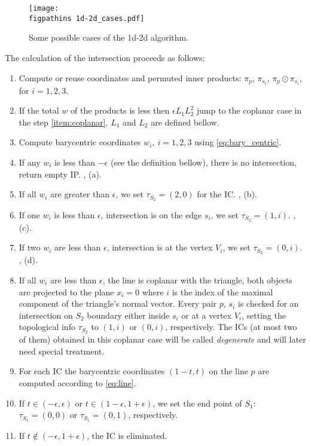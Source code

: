 \begin{figure}[!htb]
    \centering
    \texttt{[image: \\figpathins 1d-2d\_cases.pdf]}
    \caption{Some possible cases of the 1d-2d algorithm.}
    \label{fig:1d2d_cases}
\end{figure}


The calculation of the intersection proceeds as follows:
\begin{enumerate}
    \item Compute or reuse \plucker coordinates and permuted inner products: $\pi_p$, $\pi_{s_i}$, $\pi_p \odot \pi_{s_i}$, for $i=1,2,3$.
    \item \label{item:zero_total} If the total $w$ of the products is less then $\epsilon L_1 L_2^2$ jump to the coplanar case in the step \ref{item:coplanar}.
          $L_1$ and $L_2$ are defined bellow.
    \item Compute barycentric coordinates $w_i,\ i=1,2,3$ using \eqref{eq:bary_centric}.
    \item If any $w_i$ is less than $-\epsilon$ (see the definition bellow), there is no intersection, return empty IP. , (a).          
    \item If all $w_i$ are greater than $\epsilon$, we set $\tau_{S_2} = (2, 0)$ for the IC. , (b).
    \item If one $w_i$ is less than $\epsilon$, intersection is on the edge $s_i$, we set $\tau_{S_2} =(1,i)$. , (c).
    \item If two $w_i$ are less than $\epsilon$, intersection is at the vertex $V_i$, we set $\tau_{S_2}=(0,i)$. , (d).
    \item \label{item:coplanar} If all $w_i$ are less than $\epsilon$, the line is coplanar with the triangle, both objects are 
        projected to the plane $x_i=0$ where $i$ is the index of the maximal component of the triangle's normal vector.
        Every pair $p$, $s_i$ is checked for an intersection on $S_2$ boundary either inside $s_i$ or at a vertex $V_i$, 
        setting the topological info $\tau_{S_2}$ to 
        $(1, i)$ or $(0, i)$, respectively. The ICs (at most two of them) obtained in this coplanar case will be called 
        \emph{degenerate} and will later need special treatment.
    \item For each IC the barycentric coordinates $(1-t, t)$ on the line $p$ are computed according to \eqref{eq:line}. 
    \item If $t\in (-\epsilon, \epsilon)$ or $t\in (1-\epsilon, 1+\epsilon)$,
        we set the end point of $S_1$: $\tau_{S_1} = (0,0)$ or $\tau_{S_1} = (0,1)$, respectively.
    \item If $t\notin (-\epsilon, 1+\epsilon)$, the IC is eliminated.
\end{enumerate}

